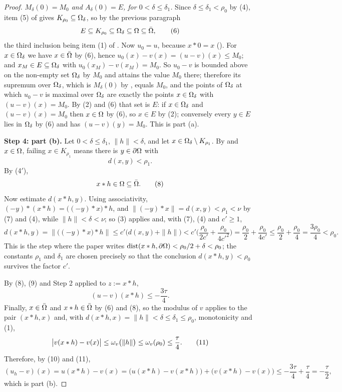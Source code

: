 \begin{proof}
\emph{$M_\delta(0)=M_0$ and $A_\delta(0)=E$, for $0<\delta\le\delta_1$.} Since
$\delta\le\delta_1<\rho_0$ by (4), item (5) of  gives
$K_{\rho_0}\subseteq\Omega_\delta$, so by the previous paragraph
\[
 E\subseteq K_{\rho_0}\subseteq\Omega_\delta\subseteq\Omega\subseteq\bar{\Omega} , \tag{6}
\]
the third inclusion being item (1) of . Now $u_0=u$, because
$x*0=x$ (). For $x\in\Omega_\delta$ we have $x\in\bar{\Omega}$ by (6), hence
$u_0(x)-v(x)=(u-v)(x)\le M_0$; and $x_M\in E\subseteq\Omega_\delta$ with
$u_0(x_M)-v(x_M)=M_0$. So $u_0-v$ is bounded above on the non-empty set $\Omega_\delta$ by
$M_0$ and attains the value $M_0$ there; therefore its supremum over $\Omega_\delta$, which is
$M_\delta(0)$ by , equals $M_0$, and the points of $\Omega_\delta$ at
which $u_0-v$ is maximal over $\Omega_\delta$ are exactly the points $x\in\Omega_\delta$ with
$(u-v)(x)=M_0$. By (2) and (6) that set is $E$: if $x\in\Omega_\delta$ and $(u-v)(x)=M_0$ then
$x\in\Omega$ by (6), so $x\in E$ by (2); conversely every $y\in E$ lies in $\Omega_\delta$ by (6)
and has $(u-v)(y)=M_0$. This is part (a).

\medskip\noindent\textbf{Step 4: part (b).} Let $0<\delta\le\delta_1$, $\|h\|<\delta$, and
let $x\in\Omega_\delta\setminus K_{\rho_1}$. By  and $x\in\Omega$, failing
$x\in K_{\rho_1}$ means there is $y\in\partial\Omega$ with
\[
 d(x,y)<\rho_1 . \tag{7}
\]
By (4$'$),
\[
 x*h\in\Omega\subseteq\bar{\Omega} . \tag{8}
\]
Now estimate $d(x*h,y)$. Using associativity,
$(-y)*(x*h)=\big((-y)*x\big)*h$, and $\|(-y)*x\|=d(x,y)<\rho_1<\nu$ by (7) and (4), while
$\|h\|<\delta<\nu$; so (3) applies and, with (7), (4) and $c'\ge1$,
\[
 d(x*h,y)=\big\|\big((-y)*x\big)*h\big\|\le c'\big(d(x,y)+\|h\|\big)
 <c'\Big(\frac{\rho_0}{2c'}+\frac{\rho_0}{4c'^{2}}\Big)
 =\frac{\rho_0}2+\frac{\rho_0}{4c'}\le\frac{\rho_0}2+\frac{\rho_0}4=\frac{3\rho_0}4<\rho_0 .
 \tag{9}
\]
This is the step where the paper writes $\operatorname{dist}(x*h,\partial\Omega)<\rho_0/2+\delta<\rho_0$; the
constants $\rho_1$ and $\delta_1$ are chosen precisely so that the conclusion
$d(x*h,y)<\rho_0$ survives the factor $c'$.

By (8), (9) and Step 2 applied to $z:=x*h$,
\[
 (u-v)(x*h)\le-\frac{3\tau}4 . \tag{10}
\]
Finally, $x\in\bar{\Omega}$ and $x*h\in\bar{\Omega}$ by (6) and (8), so the modulus of $v$ applies to
the pair $(x*h,x)$ and, with $d(x*h,x)=\|h\|<\delta\le\delta_1\le\rho_0$, monotonicity and
(1),
\[
 \big|v(x*h)-v(x)\big|\le\omega_v\big(\|h\|\big)\le\omega_v(\rho_0)\le\frac\tau4 . \tag{11}
\]
Therefore, by (10) and (11),
\[
 (u_h-v)(x)=u(x*h)-v(x)=\big(u(x*h)-v(x*h)\big)+\big(v(x*h)-v(x)\big)
 \le-\frac{3\tau}4+\frac\tau4=-\frac\tau2 ,
\]
which is part (b).


\end{proof}
